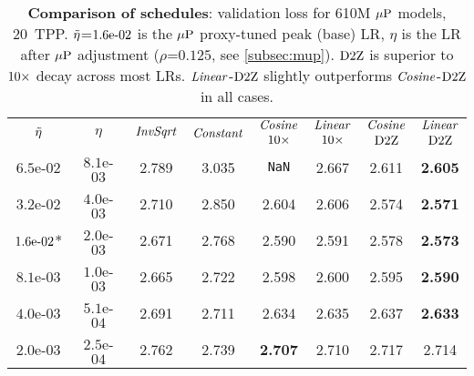 \begin{table}
  \centering
  \caption{\textbf{Comparison of schedules}: validation loss for 610M
    $\mbox{$\mu$P}$ models, 20~TPP\@.  $\tilde{\eta}$=$1.6\mbox{e-}02$ is the $\mbox{$\mu$P}$
    proxy-tuned peak (base) LR, $\eta$ is the LR after $\mbox{$\mu$P}$
    adjustment ($\rho$=$0.125$, see \cref{subsec:mup}). $\mbox{D2Z}$ is
    superior to $\mbox{10}\times$ decay across most LRs. $\mbox{\emph{Linear}}$-$\mbox{D2Z}$
    slightly outperforms $\mbox{\emph{Cosine}}$-$\mbox{D2Z}$ in all
    cases.\label{tab:sched_compare}}
  \begin{tabular}{@{}cccccccc@{}}
    \toprule
    \multirow{2}{*}{$\tilde{\eta}$} & \multirow{2}{*}{$\eta$} &\multirow{2}{*}{$\mbox{\emph{InvSqrt}}$} & \multirow{2}{*}{$\mbox{\emph{Constant}}$} & $\mbox{\emph{Cosine}}$ & $\mbox{\emph{Linear}}$ & $\mbox{\emph{Cosine}}$ & $\mbox{\emph{Linear}}$ \\
                               &                         &                            &                              &   $\mbox{10}\times$ & $\mbox{10}\times$   & $\mbox{D2Z}$   & $\mbox{D2Z}$   \\ \midrule
    $6.5$e-$02$ & $8.1$e-$03$ & 2.789      & 3.035       & \texttt{NaN}               & 2.667             & 2.611             & \textbf{2.605}    \\
    $3.2$e-$02$ & $4.0$e-$03$  & 2.710      & 2.850       & 2.604             & 2.606             & 2.574             & \textbf{2.571}    \\
    $1.6\mbox{e-}02$* & $2.0$e-$03$ & 2.671      & 2.768       & 2.590             & 2.591             & 2.578             & \textbf{2.573}    \\
    $8.1$e-$03$ & $1.0$e-$03$ & 2.665      & 2.722       & 2.598             & 2.600             & 2.595             & \textbf{2.590}    \\
    $4.0$e-$03$ & $5.1$e-$04$ & 2.691      & 2.711       & 2.634             & 2.635             & 2.637             & \textbf{2.633}    \\
    $2.0$e-$03$ & $2.5$e-$04$ & 2.762      & 2.739       & \textbf{2.707}    & 2.710             & 2.717             & 2.714             \\ \bottomrule
  \end{tabular}
\end{table}
